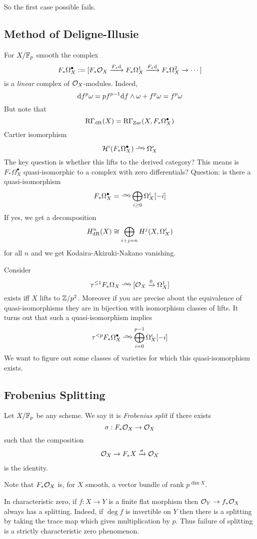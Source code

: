 \documentclass[12pt]{article}
\newcommand{\R}{\mathrm{R}}
\begin{document}
So the first case possible fails. 

\subsection{Method of Deligne-Illusie}

For $X / \mathbb{F}_p$ smooth the complex
\[ F_* \Omega_X^\bullet := [F_* \mathcal{O}_{X} \xrightarrow{F_* \mathrm{d}} F_* \Omega^1_X \xrightarrow{F_* \mathrm{d}} F_* \Omega_X^2 \to \cdots]  \]
is a \textit{linear} complex of $\mathcal{O}_{X}$-modules. Indeed,
\[ \mathrm{d}{f^p \omega} = p f^{p-1} \mathrm{d}{f} \wedge \omega + f^p \omega = f^p \omega \]
But note that 
\[ \R \Gamma_{\dR}(X) = \R \Gamma_{\Zar}(X, F_* \Omega_X^\bullet) \]
Cartier isomorphism
\[ \cH^i(F_* \Omega_X^\bullet) \iso \Omega^i_X \]
The key question is whether this lifts to the derived category? This means is $F_* \Omega_X^\bullet$ quasi-isomorphic to a complex with zero differentials? Question: is there a quasi-isomorphism
\[ F_* \Omega^\bullet_X =\iso \bigoplus_{i \ge 0} \Omega^i_X[-i] \]
If yes, we get a decomposition
\[ H^n_{\mathrm{dR}}(X) \cong \bigoplus_{i + j = n} H^j(X, \Omega^i_X) \]
for all $n$ and we get Kodaira-Akizuki-Nakano vanishing. 

Consider
\[ \tau^{\le 1} F_* \Omega_X \iso [\struct{X} \xrightarrow{0} \Omega_X^1] \]
exists iff $X$ lifts to $\mathbb{Z} / p^2$. Moreover if you are precise about the equivalence of quasi-isomorphisms they are in bijection with isomorphism classes of lifts. It turns out that such a quasi-isomorphism implies 
\[ \tau^{< p} F_* \Omega_X^\bullet \iso \bigoplus_{i = 0}^{p-1} \Omega^i_X [-i] \]
We want to figure out some classes of varieties for which this quasi-isomorphism exists.

\subsection{Frobenius Splitting}

\begin{defn}
Let $X / \mathbb{F}_p$ be any scheme. We say it is \textit{Frobenius split} if there exists
\[ \sigma : F_* \mathcal{O}_{X} \to \mathcal{O}_{X} \]
such that the composition
\[ \mathcal{O}_{X} \to F_* \strut{X} \xrightarrow{\sigma} \mathcal{O}_{X} \]
is the identity.
\end{defn}

Note that $F_* \mathcal{O}_{X}$ is, for $X$ smooth, a vector bundle of rank $p^{\dim{X}}$.

\begin{rmk}
In characteristic zero, if $f : X \to Y$ is a finite flat morphism then $\mathcal{O}_{Y} \to f_* \mathcal{O}_{X}$ always has a splitting. Indeed, if $\deg{f}$ is invertible on $Y$ then there is a splitting by taking the trace map which gives multiplication by $p$. Thus failure of splitting is a strictly characteristic zero phenomenon. 
\end{rmk}
\end{document}

